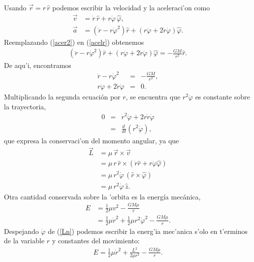 Usando $\vec{r}=r\,\hat{r}$ podemos escribir la velocidad y la aceleraci'on como
\begin{align}
\vec{v} & = \dot{r}\,\hat{r}+r\dot{\varphi}\,\hat{\varphi} ,\label{vel1}\\
\vec{a} & = \left(\ddot{r}-r\dot{\varphi}^2\right)\hat{r} +\left(r\ddot{\varphi}+2\dot{r}\dot{\varphi}\right)\hat{\varphi} .\label{acer2}
\end{align}
Reemplazando (\ref{acer2}) en (\ref{acelr}) obtenemos
\begin{eqnarray}
\left(\ddot{r}-r\dot{\varphi}^2\right)\hat{r}+
\left(r\ddot{\varphi}+2\dot{r}\dot{\varphi}\right)\hat{\varphi}
=-\frac{GM}{r^2}\hat{r}.
\end{eqnarray}
De aqu'i, encontramos
\begin{eqnarray}
\ddot{r}-r\dot{\varphi}^2&=&-\frac{GM}{r^2},\label{acer3}\\
r\ddot{\varphi}+2\dot{r}\dot{\varphi}&=&0.\label{acer4}
\end{eqnarray}
Multiplicando la segunda ecuaci\'on por $r$, se encuentra que $r^2\dot{\varphi}$ es constante sobre la trayectoria,
\begin{eqnarray}
0&=&r^2\ddot{\varphi}+2r\dot{r}\dot{\varphi}\\
&=&\frac{d\ }{dt}\left(r^2\dot{\varphi}\right),
\end{eqnarray}
que expresa la conservaci'on del momento angular, ya que
\begin{align}
\vec{L} & = \mu\,\vec{r}\times\vec{v}\\
& = \mu\,r\,\hat{r}\times\left(\dot{r}\hat{r}+r\dot{\varphi}\hat{\varphi}
\right)\\
& = \mu\,r^2\dot{\varphi}\,(\hat{r}\times\hat{\varphi})\\
& = \mu\,r^2\dot{\varphi}\,\hat{z}. \label{Ln}
\end{align}
Otra cantidad conservada sobre la 'orbita es la energ\'ia mec\'anica,
\begin{align}
E&=\frac{1}{2}\mu v^2-\frac{GM\mu}{r} \label{ener1}\\
&=\frac{1}{2}\mu\dot{r}^2+\frac{1}{2}\mu r^2\dot{\varphi}^2-\frac{GM\mu}{r}.\label{ener2}
\end{align}
Despejando $\dot{\varphi}$ de (\ref{Ln}) podemos escribir la energ'ia mec'anica s'olo en t'erminos de la variable $r$ y constantes del movimiento:
\begin{eqnarray}
E=\frac{1}{2}\mu\dot{r}^2+\frac{L^2}{2\mu r^2}-\frac{GM\mu}{r} .\label{ener3}
\end{eqnarray}
